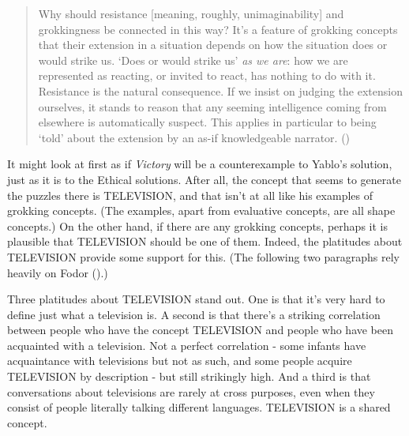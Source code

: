 \documentclass[
  10pt,
  letterpaper,
  DIV=11,
  numbers=noendperiod,
  twoside]{scrartcl}
\begin{document}
\begin{quote}
Why should resistance {[}meaning, roughly, unimaginability{]} and
grokkingness be connected in this way? It's a feature of grokking
concepts that their extension in a situation depends on how the
situation does or would strike us. `Does or would strike us' \emph{as we
are}: how we are represented as reacting, or invited to react, has
nothing to do with it. Resistance is the natural consequence. If we
insist on judging the extension ourselves, it stands to reason that any
seeming intelligence coming from elsewhere is automatically suspect.
This applies in particular to being `told' about the extension by an
as-if knowledgeable narrator. ()
\end{quote}

It might look at first as if \emph{Victory} will be a counterexample to
Yablo's solution, just as it is to the Ethical solutions. After all, the
concept that seems to generate the puzzles there is TELEVISION, and that
isn't at all like his examples of grokking concepts. (The examples,
apart from evaluative concepts, are all shape concepts.) On the other
hand, if there are any grokking concepts, perhaps it is plausible that
TELEVISION should be one of them. Indeed, the platitudes about
TELEVISION provide some support for this. (The following two paragraphs
rely heavily on Fodor ().)

Three platitudes about TELEVISION stand out. One is that it's very hard
to define just what a television is. A second is that there's a striking
correlation between people who have the concept TELEVISION and people
who have been acquainted with a television. Not a perfect correlation -
some infants have acquaintance with televisions but not as such, and
some people acquire TELEVISION by description - but still strikingly
high. And a third is that conversations about televisions are rarely at
cross purposes, even when they consist of people literally talking
different languages. TELEVISION is a shared concept.
\end{document}

